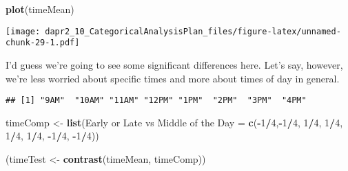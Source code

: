\documentclass[
]{article}
\newenvironment{Shaded}{\begin{snugshade}}{\end{snugshade}}
\newcommand{\DecValTok}[1]{\textcolor[rgb]{0.00,0.00,0.81}{#1}}
\newcommand{\FunctionTok}[1]{\textcolor[rgb]{0.13,0.29,0.53}{\textbf{#1}}}
\newcommand{\NormalTok}[1]{#1}
\newcommand{\OtherTok}[1]{\textcolor[rgb]{0.56,0.35,0.01}{#1}}
\newcommand{\SpecialCharTok}[1]{\textcolor[rgb]{0.81,0.36,0.00}{\textbf{#1}}}
\newcommand{\StringTok}[1]{\textcolor[rgb]{0.31,0.60,0.02}{#1}}
\begin{document}
\begin{Shaded}
\begin{Highlighting}[]
\FunctionTok{plot}\NormalTok{(timeMean)}
\end{Highlighting}
\end{Shaded}

\texttt{[image: dapr2\_10\_CategoricalAnalysisPlan\_files/figure-latex/unnamed-chunk-29-1.pdf]}

I'd guess we're going to see some significant differences here. Let's say, however, we're less worried about specific times and more about times of day in general.

\begin{Shaded}
\end{Shaded}

\begin{verbatim}
## [1] "9AM"  "10AM" "11AM" "12PM" "1PM"  "2PM"  "3PM"  "4PM"
\end{verbatim}

\begin{Shaded}
\begin{Highlighting}[]
\NormalTok{timeComp }\OtherTok{\textless{}{-}} \FunctionTok{list}\NormalTok{(}\StringTok{\textquotesingle{}Early or Late vs Middle of the Day\textquotesingle{}} \OtherTok{=} \FunctionTok{c}\NormalTok{(}\SpecialCharTok{{-}}\DecValTok{1}\SpecialCharTok{/}\DecValTok{4}\NormalTok{,}\SpecialCharTok{{-}}\DecValTok{1}\SpecialCharTok{/}\DecValTok{4}\NormalTok{, }\DecValTok{1}\SpecialCharTok{/}\DecValTok{4}\NormalTok{, }\DecValTok{1}\SpecialCharTok{/}\DecValTok{4}\NormalTok{, }\DecValTok{1}\SpecialCharTok{/}\DecValTok{4}\NormalTok{, }\DecValTok{1}\SpecialCharTok{/}\DecValTok{4}\NormalTok{, }\SpecialCharTok{{-}}\DecValTok{1}\SpecialCharTok{/}\DecValTok{4}\NormalTok{, }\SpecialCharTok{{-}}\DecValTok{1}\SpecialCharTok{/}\DecValTok{4}\NormalTok{))}
\end{Highlighting}
\end{Shaded}

\begin{Shaded}
\begin{Highlighting}[]
\NormalTok{(timeTest }\OtherTok{\textless{}{-}} \FunctionTok{contrast}\NormalTok{(timeMean, timeComp))}
\end{Highlighting}
\end{Shaded}
\end{document}
